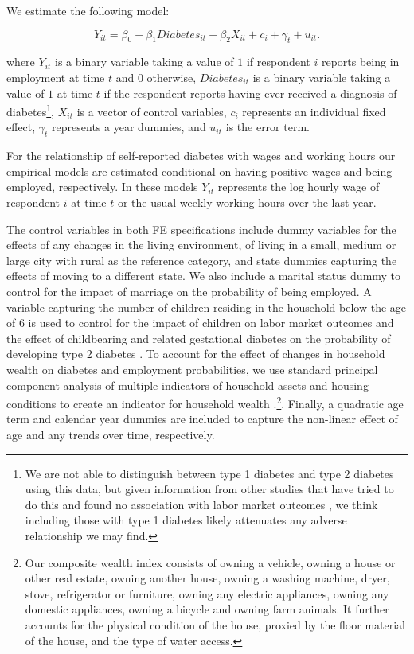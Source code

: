 \documentclass[12pt,english]{article}
\begin{document}
We estimate the following model:

\noindent 
\begin{equation}
Y_{it}=\beta_{0}+\beta_{1}Diabetes_{it}+\beta_{2}X_{it}+c_{i}+\gamma_{t}+u_{it}.\label{eq:employed}
\end{equation}


where $Y_{it}$ is a binary variable taking a value of $1$ if respondent $i$ reports being in employment at time $t$ and $0$ otherwise, $Diabetes_{it}$ is a binary variable taking a value of $1$ at time $t$ if the respondent reports having ever received a diagnosis of diabetes\footnote{We are not able to distinguish between type 1 diabetes and type 2 diabetes using this data, but given information from other studies that have tried to do this and found no association with labor market outcomes \parencite{Minor2010,Minor2015}, we think including those with type 1 diabetes likely attenuates any adverse relationship we may find.}, $X_{it}$ is a vector of control variables, $c_{i}$ represents an individual fixed effect, $\gamma_{t}$ represents a year dummies, and $u_{it}$ is the error term.

For the relationship of self-reported diabetes with wages and working hours our empirical models are estimated conditional on having positive wages and being employed, respectively. In these models $Y_{it}$ represents the log hourly wage of respondent $i$ at time $t$ or the usual weekly working hours over the last year.

The control variables in both \ac{FE} specifications include dummy variables for the effects of any changes in the living environment,
of living in a small, medium or large city with rural as the reference category, and state dummies capturing the effects of moving to a different state. We also include a marital status dummy to control for the impact of marriage on the probability of being employed.
A variable capturing the number of children residing in the household below the age of 6 is used to control for the impact of children
on labor market outcomes and the effect of childbearing and related gestational diabetes on the probability of developing type 2 diabetes
\parencite{Bellamy2009}. To account for the effect of changes in household wealth on diabetes and employment probabilities, we use standard
principal component analysis of multiple indicators of household assets and housing conditions to create an indicator for household wealth
\parencite{Filmer2001}.\footnote{Our composite wealth index consists of owning a vehicle, owning a house or other real estate, owning another house, owning a washing machine, dryer, stove, refrigerator or furniture, owning any electric appliances, owning any domestic appliances, owning a bicycle and owning farm animals. It further accounts for the physical condition of the house, proxied by the floor material of the house, and the type of water access.}. Finally, a quadratic age term and calendar year dummies are included to capture the non-linear effect of age and any trends over time, respectively.
\end{document}
